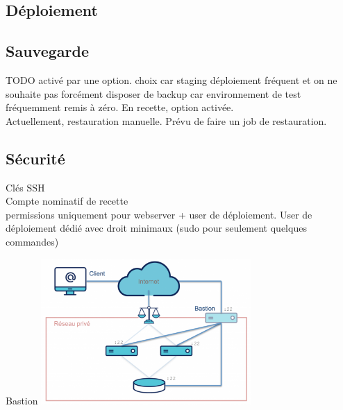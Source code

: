\subsection{Déploiement}
\begin{frame}{\subsecname}
		
\end{frame}

\subsection{Sauvegarde}
\begin{frame}{\subsecname}
	TODO activé par une option. choix car staging déploiement fréquent et on ne souhaite pas forcément disposer de backup car environnement de test fréquemment remis à zéro. En recette, option activée. \\ 
	
	Actuellement, restauration manuelle. Prévu de faire un job de restauration.
\end{frame}

\subsection{Sécurité}
\begin{frame}{\subsecname}
	Clés SSH  \\
	Compte nominatif de recette \\
	permissions uniquement pour webserver + user de déploiement. 
	User de déploiement dédié avec droit minimaux (sudo pour seulement quelques commandes)
\end{frame}

\begin{frame}{Bastion}
	\centering \includegraphics[width=0.60\textwidth]{img/bastion.png}
\end{frame}
